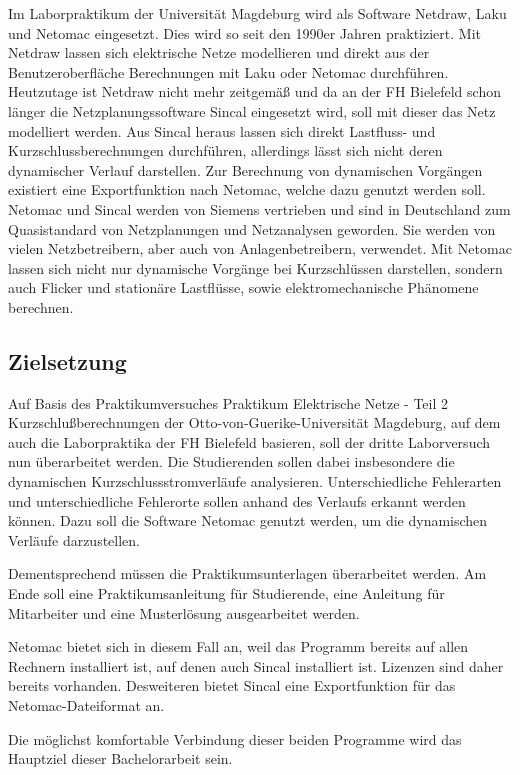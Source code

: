 \documentclass{scrartcl}
\begin{document}
\begin{onehalfspace}
Im Laborpraktikum der Universität Magdeburg wird als Software Netdraw, Laku und Netomac eingesetzt. Dies wird so seit den 1990er Jahren praktiziert. Mit Netdraw lassen sich elektrische Netze modellieren und direkt aus der Benutzeroberfläche Berechnungen mit Laku oder Netomac durchführen.
Heutzutage ist Netdraw nicht mehr zeitgemäß und da an der FH Bielefeld schon länger die Netzplanungssoftware Sincal eingesetzt wird, soll mit dieser das Netz modelliert werden. Aus Sincal heraus lassen sich direkt Lastfluss- und Kurzschlussberechnungen durchführen, allerdings lässt sich nicht deren dynamischer Verlauf darstellen. Zur Berechnung von dynamischen Vorgängen existiert eine Exportfunktion nach Netomac, welche dazu genutzt werden soll. Netomac und Sincal werden von Siemens vertrieben und sind in Deutschland zum Quasistandard von Netzplanungen und Netzanalysen geworden. Sie werden von vielen Netzbetreibern, aber auch von Anlagenbetreibern, verwendet. Mit Netomac lassen sich nicht nur dynamische Vorgänge bei Kurzschlüssen darstellen, sondern auch Flicker und stationäre Lastflüsse, sowie elektromechanische Phänomene berechnen.
 
\subsection{Zielsetzung}
Auf Basis des Praktikumversuches \glqq Praktikum Elektrische Netze - Teil 2 Kurzschlußberechnungen\grqq{} der Otto-von-Guerike-Universität Magdeburg, auf dem auch die Laborpraktika der FH Bielefeld basieren, soll der dritte Laborversuch nun überarbeitet werden. Die Studierenden sollen dabei insbesondere die dynamischen Kurzschlussstromverläufe analysieren. Unterschiedliche Fehlerarten und unterschiedliche Fehlerorte sollen anhand des Verlaufs erkannt werden können. Dazu soll die Software Netomac genutzt werden, um die dynamischen Verläufe darzustellen.

Dementsprechend müssen die Praktikumsunterlagen überarbeitet werden. Am Ende soll eine Praktikumsanleitung für Studierende, eine Anleitung für Mitarbeiter und eine Musterlösung ausgearbeitet werden.

Netomac bietet sich in diesem Fall an, weil das Programm bereits auf allen Rechnern installiert ist, auf denen auch Sincal installiert ist. Lizenzen sind daher bereits vorhanden. Desweiteren bietet Sincal eine Exportfunktion für das Netomac-Dateiformat an.

Die möglichst komfortable Verbindung dieser beiden Programme wird das Hauptziel dieser Bachelorarbeit sein.


\end{onehalfspace}
\end{document}
